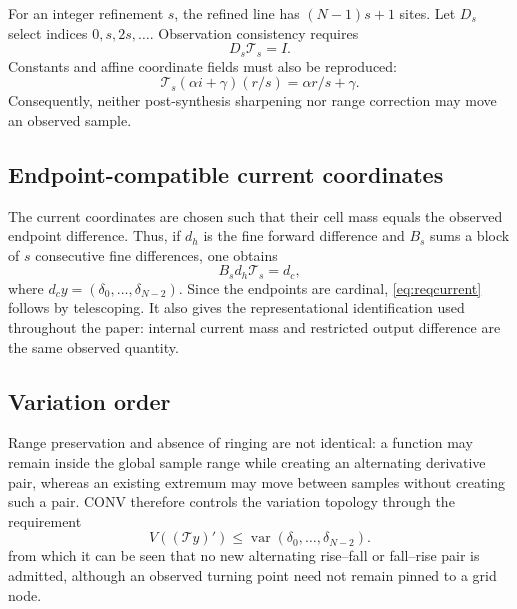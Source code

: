 \documentclass[journal]{IEEEtran}
\newcommand{\Tcal}{\mathcal{T}}
\newcommand{\var}{\operatorname{var}}
\begin{document}
For an integer refinement \(s\), the refined line has
\((N-1)s+1\) sites. Let \(D_s\) select indices \(0,s,2s,\ldots\).
Observation consistency requires
\begin{equation}
 D_s\Tcal_s=I.
 \label{eq:reqcardinal}
\end{equation}
Constants and affine coordinate fields must also be reproduced:
\begin{equation}
 \Tcal_s(\alpha i+\gamma)(r/s)=\alpha r/s+\gamma.
 \label{eq:reqaffine}
\end{equation}
Consequently, neither post-synthesis sharpening nor range correction may move
an observed sample.

\subsection{Endpoint-compatible current coordinates}

The current coordinates are chosen such that their cell mass equals the
observed endpoint difference. Thus, if \(d_h\) is the fine forward difference
and \(B_s\) sums a block of \(s\) consecutive fine differences, one obtains
\begin{equation}
 B_s d_h\Tcal_s=d_c,
 \label{eq:reqcurrent}
\end{equation}
where \(d_c y=(\delta_0,\ldots,\delta_{N-2})\). Since the endpoints are
cardinal, \eqref{eq:reqcurrent} follows by telescoping. It also gives the
representational identification used throughout the paper: internal current
mass and restricted output difference are the same observed quantity.

\subsection{Variation order}

Range preservation and absence of ringing are not identical: a function may
remain inside the global sample range while creating an alternating
derivative pair, whereas an existing extremum may move between samples
without creating such a pair. CONV therefore controls the variation topology
through the requirement
\begin{equation}
 V((\Tcal y)')\leq
 \var(\delta_0,\ldots,\delta_{N-2}).
 \label{eq:reqvariation}
\end{equation}
from which it can be seen that no new alternating rise--fall or fall--rise
pair is admitted, although an observed turning point need not remain pinned
to a grid node.
\end{document}
